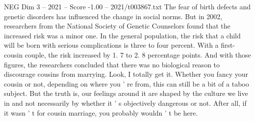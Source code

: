 \begin{textsample}{NEG Dim 3 – 2021 – Score -1.00 – 2021/t003867.txt}
The fear of birth defects and genetic disorders has influenced the change in social norms.
But in 2002, researchers from the National Society of Genetic Counselors found that the increased risk was a minor one.
In the general population, the risk that a child will be born with serious complications is three to four percent.
With a first-cousin couple, the risk increased by 1. 7 to 2. 8 percentage points.
And with those figures, the researchers concluded that there was no biological reason to discourage cousins from marrying.
Look, I totally get it.
Whether you fancy your cousin or not, depending on where you ' re from, this can still be a bit of a taboo subject.
But the truth is, our feelings around it are shaped by the culture we live in and not necessarily by whether it ' s objectively dangerous or not.
After all, if it wasn ' t for cousin marriage, you probably wouldn ' t be here.

\end{textsample}
